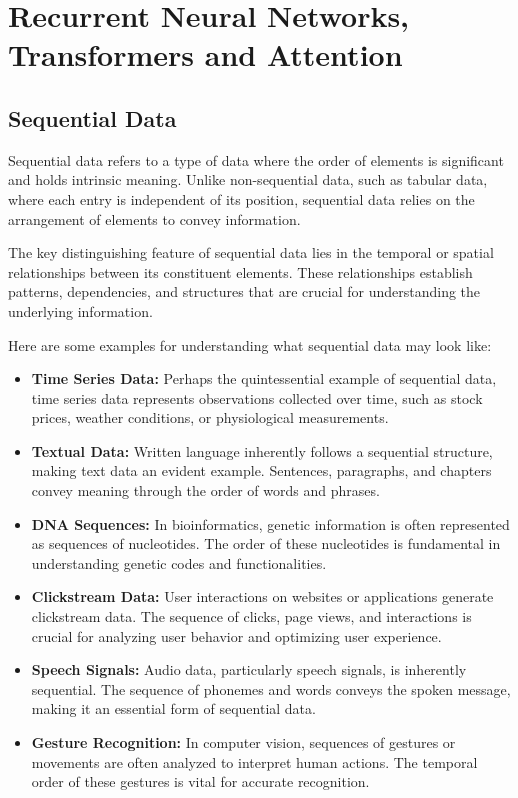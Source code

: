 \documentclass{report}
\begin{document}
\chapter{Recurrent Neural Networks, Transformers and Attention}

\section{Sequential Data}
Sequential data refers to a type of data where the order of elements is significant and holds intrinsic meaning. Unlike non-sequential data, such as tabular data, where each entry is independent of its position, sequential data relies on the arrangement of elements to convey information.

The key distinguishing feature of sequential data lies in the temporal or spatial relationships between its constituent elements. These relationships establish patterns, dependencies, and structures that are crucial for understanding the underlying information.

Here are some examples for understanding what sequential data may look like:
\begin{itemize}
	\item \textbf{Time Series Data:} Perhaps the quintessential example of sequential data, time series data represents observations collected over time, such as stock prices, weather conditions, or physiological measurements.
\item \textbf{Textual Data:} Written language inherently follows a sequential structure, making text data an evident example. Sentences, paragraphs, and chapters convey meaning through the order of words and phrases. 
\item \textbf{DNA Sequences:} In bioinformatics, genetic information is often represented as sequences of nucleotides. The order of these nucleotides is fundamental in understanding genetic codes and functionalities.
\item \textbf{Clickstream Data:} User interactions on websites or applications generate clickstream data. The sequence of clicks, page views, and interactions is crucial for analyzing user behavior and optimizing user experience.
\item \textbf{Speech Signals:} Audio data, particularly speech signals, is inherently sequential. The sequence of phonemes and words conveys the spoken message, making it an essential form of sequential data.

\item \textbf{Gesture Recognition:} In computer vision, sequences of gestures or movements are often analyzed to interpret human actions. The temporal order of these gestures is vital for accurate recognition.
\end{itemize}
\end{document}
